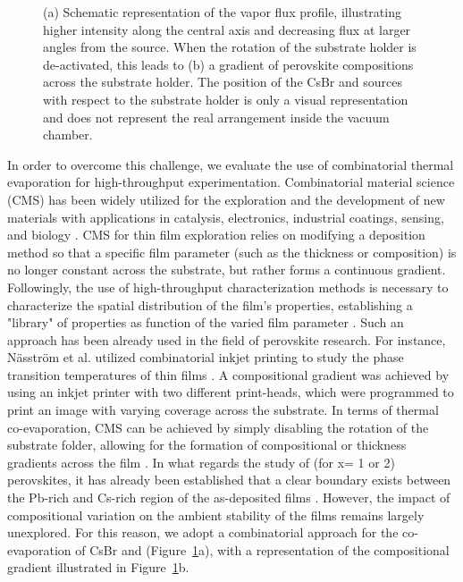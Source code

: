 \begin{figure}[htbp]
    \caption[Schematic illustration of compositional gradient across the substrate holder when the sample rotation during evaporation is de-activated. ]{(a) Schematic representation of the vapor flux profile, illustrating higher intensity along the central axis and decreasing flux at larger angles from the source. When the rotation of the substrate holder is de-activated, this leads to (b) a gradient of perovskite compositions across the substrate holder. The position of the CsBr and  sources with respect to the substrate holder is only a visual representation and does not represent the real arrangement inside the vacuum chamber.}   
    \label{fig:stability:combinatorial_approach}
\end{figure}


In order to overcome this challenge, we evaluate the use of combinatorial thermal evaporation for high-throughput experimentation. Combinatorial material science (CMS) has been widely utilized for the exploration and the development of new materials with applications in catalysis, electronics, industrial coatings, sensing, and biology \cite{Potyrailo2011CombinatorialArt}. CMS for thin film exploration relies on modifying a deposition method so that a specific film parameter (such as the thickness or composition) is no longer constant across the substrate, but rather forms a continuous gradient. Followingly, the use of high-throughput characterization methods is necessary to characterize the spatial distribution of the film's properties, establishing a "library" of properties as function of the varied film parameter \cite{McGinn2019Thin-filmReview, Xiang1999CombinatorialMaterials, Ludwig2019DiscoveryMethods}. Such an approach has been already used in the field of perovskite research. For instance, Näsström et al. utilized combinatorial inkjet printing to study the phase transition temperatures of  thin films \cite{Nasstrom2020DependenceExperimentation}. A compositional gradient was achieved by using an inkjet printer with two different print-heads, which were programmed to print an image with varying coverage across the substrate. In terms of thermal co-evaporation, CMS can be achieved by simply disabling the rotation of the substrate folder, allowing for the formation of compositional or thickness gradients across the film  \cite{Becker2019LowExperimentation, Susic2023CombinatorialCells, Lin2024FormationTreatment, Huang2021Vapor-deposited16, Li2019High-ThroughputDeposition}. In what regards the study of   (for x= 1 or 2) perovskites, it has already been established that a clear boundary exists between the Pb-rich and Cs-rich region of the as-deposited films \cite{Becker2019LowExperimentation, Huang2021Vapor-deposited16, Lin2024FormationTreatment}. However, the impact of compositional variation on the ambient stability of the films remains largely unexplored. For this reason, we adopt a combinatorial approach for the co-evaporation of CsBr and  (Figure~\ref{fig:stability:combinatorial_approach}a), with a representation of the compositional gradient illustrated in Figure~\ref{fig:stability:combinatorial_approach}b.


